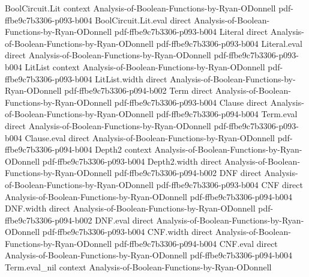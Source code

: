 \begin{theorem}
\leanok
{}
\proofstep
  {BoolCircuit.Lit}
  {context}
  {Analysis-of-Boolean-Functions-by-Ryan-ODonnell}
  {pdf-ffbe9c7b3306-p093-b004}
\proofstep
  {BoolCircuit.Lit.eval}
  {direct}
  {Analysis-of-Boolean-Functions-by-Ryan-ODonnell}
  {pdf-ffbe9c7b3306-p093-b004}
\proofstep
  {Literal}
  {direct}
  {Analysis-of-Boolean-Functions-by-Ryan-ODonnell}
  {pdf-ffbe9c7b3306-p093-b004}
\proofstep
  {Literal.eval}
  {direct}
  {Analysis-of-Boolean-Functions-by-Ryan-ODonnell}
  {pdf-ffbe9c7b3306-p093-b004}
\proofstep
  {LitList}
  {context}
  {Analysis-of-Boolean-Functions-by-Ryan-ODonnell}
  {pdf-ffbe9c7b3306-p093-b004}
\proofstep
  {LitList.width}
  {direct}
  {Analysis-of-Boolean-Functions-by-Ryan-ODonnell}
  {pdf-ffbe9c7b3306-p094-b002}
\proofstep
  {Term}
  {direct}
  {Analysis-of-Boolean-Functions-by-Ryan-ODonnell}
  {pdf-ffbe9c7b3306-p093-b004}
\proofstep
  {Clause}
  {direct}
  {Analysis-of-Boolean-Functions-by-Ryan-ODonnell}
  {pdf-ffbe9c7b3306-p094-b004}
\proofstep
  {Term.eval}
  {direct}
  {Analysis-of-Boolean-Functions-by-Ryan-ODonnell}
  {pdf-ffbe9c7b3306-p093-b004}
\proofstep
  {Clause.eval}
  {direct}
  {Analysis-of-Boolean-Functions-by-Ryan-ODonnell}
  {pdf-ffbe9c7b3306-p094-b004}
\proofstep
  {Depth2}
  {context}
  {Analysis-of-Boolean-Functions-by-Ryan-ODonnell}
  {pdf-ffbe9c7b3306-p093-b004}
\proofstep
  {Depth2.width}
  {direct}
  {Analysis-of-Boolean-Functions-by-Ryan-ODonnell}
  {pdf-ffbe9c7b3306-p094-b002}
\proofstep
  {DNF}
  {direct}
  {Analysis-of-Boolean-Functions-by-Ryan-ODonnell}
  {pdf-ffbe9c7b3306-p093-b004}
\proofstep
  {CNF}
  {direct}
  {Analysis-of-Boolean-Functions-by-Ryan-ODonnell}
  {pdf-ffbe9c7b3306-p094-b004}
\proofstep
  {DNF.width}
  {direct}
  {Analysis-of-Boolean-Functions-by-Ryan-ODonnell}
  {pdf-ffbe9c7b3306-p094-b002}
\proofstep
  {DNF.eval}
  {direct}
  {Analysis-of-Boolean-Functions-by-Ryan-ODonnell}
  {pdf-ffbe9c7b3306-p093-b004}
\proofstep
  {CNF.width}
  {direct}
  {Analysis-of-Boolean-Functions-by-Ryan-ODonnell}
  {pdf-ffbe9c7b3306-p094-b004}
\proofstep
  {CNF.eval}
  {direct}
  {Analysis-of-Boolean-Functions-by-Ryan-ODonnell}
  {pdf-ffbe9c7b3306-p094-b004}
\proofstep
  {Term.eval_nil}
  {context}
  {Analysis-of-Boolean-Functions-by-Ryan-ODonnell}

\end{theorem}
